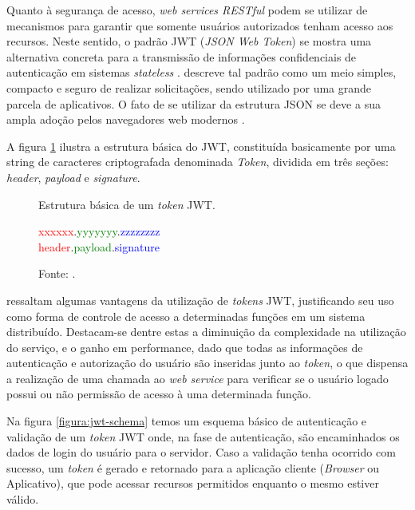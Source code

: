 Quanto à segurança de acesso, \textit{web services RESTful} podem se utilizar de mecanismos para garantir que somente usuários autorizados tenham acesso aos recursos. Neste sentido, o padrão JWT (\textit{JSON Web Token}) \cite{jwt} se mostra uma alternativa concreta para a transmissão de informações confidenciais de autenticação em sistemas \textit{stateless} \cite{jones2015json}.  descreve tal padrão como um meio simples, compacto e seguro de realizar solicitações, sendo utilizado por uma grande parcela de aplicativos. O fato de se utilizar da estrutura JSON se deve a sua ampla adoção pelos  navegadores web modernos \cite{jones2011emerging}.

A figura \ref{figura:jwt} ilustra a estrutura básica do JWT, constituída basicamente por uma string de caracteres criptografada denominada \textit{Token}, dividida em três seções: \textit{header}, \textit{payload} e \textit{signature}.

\begin{figure}[H]
	\caption{Estrutura básica de um \textit{token} JWT.}
	\label{figura:jwt}
	\begin{center}
		\textcolor{red}{xxxxxx}.\textcolor{green}{yyyyyyy}.\textcolor{blue}{zzzzzzzz}\\
		\textcolor{red}{header}.\textcolor{green}{payload}.\textcolor{blue}{signature}\\
	\end{center}
	\caption*{\footnotesize Fonte: .}
\end{figure}

 ressaltam algumas vantagens da utilização de \textit{tokens} JWT, justificando seu uso como forma de controle de acesso a determinadas funções em um sistema distribuído. Destacam-se dentre estas a diminuição da complexidade na utilização do serviço, e o ganho em performance, dado que todas as informações de autenticação e autorização do usuário são inseridas junto ao \textit{token}, o que dispensa a realização de uma chamada ao \textit{web service} para verificar se o usuário logado possui ou não permissão de acesso à uma determinada função.

Na figura \ref{figura:jwt-schema} temos um esquema básico de autenticação e validação de um \textit{token} JWT onde, na fase de autenticação, são encaminhados os dados de login do usuário para o servidor. Caso a validação tenha ocorrido com sucesso, um \textit{token} é gerado e retornado para a aplicação cliente (\textit{Browser} ou Aplicativo), que pode acessar recursos permitidos enquanto o mesmo estiver válido.

